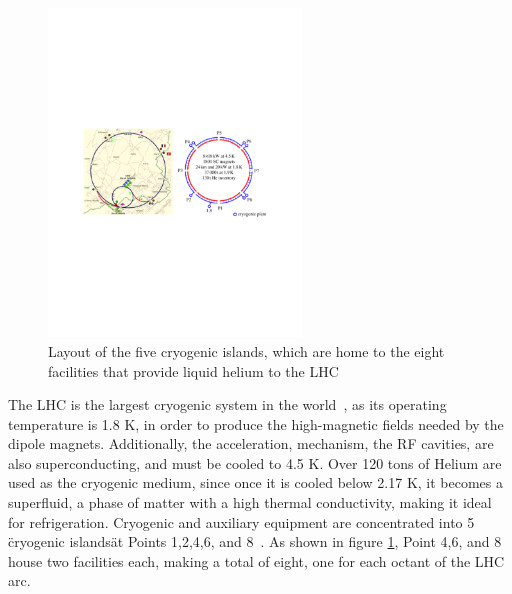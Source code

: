 \begin{figure}[h]
   \centering
  \includegraphics[width=0.6\textwidth]{Figures/LHC_Diagrams/LHC_CoolingPlants.pdf}
  \caption{Layout of the five cryogenic islands, which are home to the
  eight facilities that provide liquid helium to the LHC \cite{LHC:LHC_lhc_cryogen_islands_layout_image}} \label{fig:lhc_cryogenic_islands}
\end{figure}

\par The LHC is the largest cryogenic system in the
world~\cite{LHC:LHC_lhc_cryogen_cernWebsite}, as its operating
temperature is 1.8 K, in order to produce the high-magnetic fields
needed by the dipole magnets.  Additionally, the acceleration,
mechanism, the RF cavities, are also superconducting, and must be
cooled to 4.5 K.  Over 120 tons of Helium are used as the cryogenic
medium, since once it is cooled below 2.17 K, it becomes a superfluid,
a phase of matter with a high thermal conductivity, making it ideal
for refrigeration.  Cryogenic and auxiliary equipment are
concentrated into 5 \"cryogenic islands\" at Points 1,2,4,6, and
8~\cite{lhc:machine_description}.  As shown in figure
\ref{fig:lhc_cryogenic_islands}, Point 4,6, and 8 house two facilities
each, making a total of eight, one for each octant of the LHC arc. 

